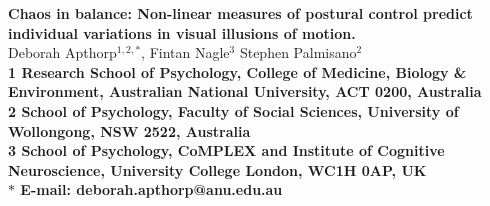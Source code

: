 \documentclass[11pt]{article}
\date{}
\begin{document}
\setpagewiselinenumbers
\modulolinenumbers[2]

\begin{flushleft}
{\Large
\textbf{Chaos in balance: Non-linear measures of postural control predict individual variations in visual illusions of motion.}
}
\\
Deborah Apthorp$^{1, 2, \ast}$, 
Fintan Nagle$^{3}$
Stephen Palmisano$^{2}$
\\
\bf{1} Research School of Psychology, College of Medicine, Biology \& Environment, Australian National University, ACT 0200, Australia
\\
\bf{2} School of Psychology, Faculty of Social Sciences, University of Wollongong, NSW 2522, Australia %
\\
\bf{3} School of Psychology, CoMPLEX and Institute of Cognitive Neuroscience, University College London, WC1H 0AP, UK %
\\
$\ast$ E-mail: deborah.apthorp@anu.edu.au
\end{flushleft}
\end{document}
